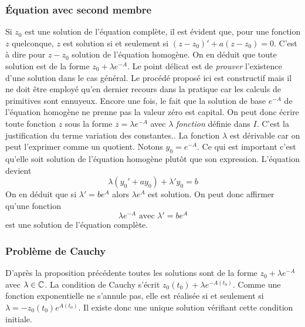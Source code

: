 \subsubsection{\'Equation avec second membre}
\begin{demo}
 Si $z_0$ est une solution de l'équation complète, il est évident que, pour une fonction $z$ quelconque, $z$ est solution si et seulement si $(z-z_0)' + a(z-z_0)=0$. C'est à dire pour $z-z_0$ solution de l'équation homogène. On en déduit que toute solution est de la forme $z_0+\lambda e^{-A}$.\newline
Le point délicat est de \emph{prouver} l'existence d'une solution dans le cas général. Le procédé proposé ici est constructif mais il ne doit être employé qu'en dernier recours dans la pratique car les calculs de primitives sont ennuyeux.\newline
Encore une fois, le fait que la solution de base $e^{-A}$ de l'équation homogène ne prenne pas la valeur zéro est capital. On peut donc écrire toute fonction $z$ sous la forme $z=\lambda e^{-A}$ avec $\lambda$ \emph{fonction} définie dans $I$. C'est la justification du terme variation des constantes.. La fonction $\lambda$ est dérivable car on peut l'exprimer comme un quotient. Notons $y_0=e^{-A}$. Ce qui est important c'est qu'elle soit solution de l'équation homogène plutôt que son expression. L'équation devient
\begin{displaymath}
 \lambda ( y_0' + ay_0) + \lambda' y_0=b
\end{displaymath}
On en déduit que si $\lambda' = be^{A}$ alors $\lambda e^{A}$ est solution. On peut donc affirmer qu'une fonction
\begin{displaymath}
 \lambda e^{-A} \text{ avec } \lambda' = be^{A}
\end{displaymath}
est une solution de l'équation complète.
\end{demo}

\subsubsection{Problème de Cauchy}
\begin{demo}
 D'après la proposition précédente toutes les solutions sont de la forme $z_0+\lambda e^{-A}$ avec $\lambda \in \mathbb{C}$. La condition de Cauchy s'écrit $z_0(t_0)+\lambda e^{-A(t_0)}$. Comme une fonction exponentielle ne s'annule pas, elle est réalisée si et seulement si $\lambda = -z_0(t_0)e^{A(t_0)}$. Il existe donc une unique solution vérifiant cette condition initiale.
\end{demo}

